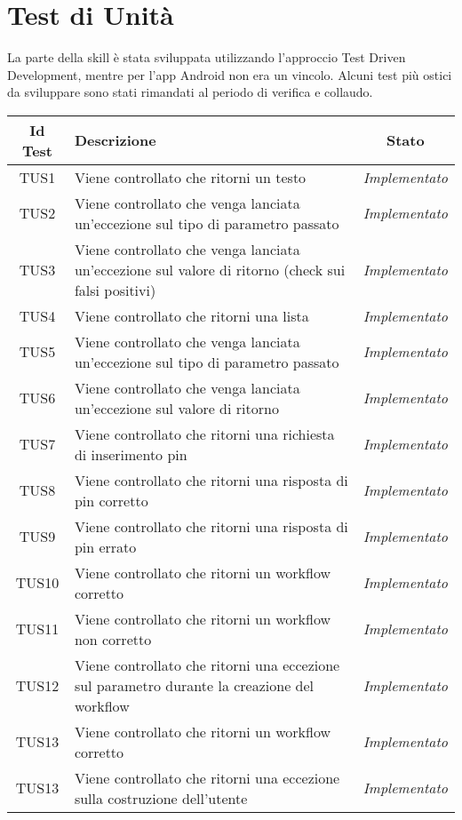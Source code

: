 \section{Test di Unità}
\label{TU}
La parte della skill è stata sviluppata utilizzando l'approccio Test Driven Development, mentre per l'app Android non era un vincolo. Alcuni test più ostici da sviluppare sono stati rimandati al periodo di verifica e collaudo. 
\normalsize
\begin{longtable}{|c|m{12em}|c|}
\hline 
\textbf{Id Test} & \textbf{Descrizione} & \textbf{Stato}\\
\hline
\endhead
TUS1 & Viene controllato che ritorni un testo & \textit{Implementato}\\ \hline
TUS2 & Viene controllato che venga lanciata un'eccezione sul tipo di parametro passato & \textit{Implementato}\\ \hline
TUS3 & Viene controllato che venga lanciata un'eccezione sul valore di ritorno (check sui falsi positivi)  & \textit{Implementato}\\ \hline
TUS4 & Viene controllato che ritorni una lista & \textit{Implementato}\\ \hline
TUS5 & Viene controllato che venga lanciata un'eccezione sul tipo di parametro passato & \textit{Implementato}\\ \hline
TUS6 & Viene controllato che venga lanciata un'eccezione sul valore di ritorno & \textit{Implementato}\\ \hline
TUS7 & Viene controllato che ritorni una richiesta di inserimento pin & \textit{Implementato}\\ \hline
TUS8 & Viene controllato che ritorni una risposta di pin corretto & \textit{Implementato}\\ \hline
TUS9 & Viene controllato che ritorni una risposta di pin errato & \textit{Implementato}\\ \hline
TUS10 & Viene controllato che ritorni un workflow corretto & \textit{Implementato}\\ \hline
TUS11 & Viene controllato che ritorni un workflow non corretto & \textit{Implementato}\\ \hline
TUS12 & Viene controllato che ritorni una eccezione sul parametro durante la creazione del workflow & \textit{Implementato}\\ \hline
TUS13 & Viene controllato che ritorni un workflow corretto & \textit{Implementato}\\ \hline
TUS13 & Viene controllato che ritorni una eccezione sulla costruzione dell'utente & \textit{Implementato}\\ \hline

\end{longtable}
